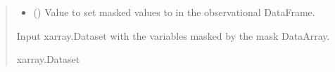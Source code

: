 \documentclass[letterpaper,10pt,english]{sphinxmanual}
\begin{document}
\begin{fulllineitems}
\begin{quote}
\begin{description}
\begin{itemize}
\item {}
\sphinxAtStartPar
{} () \textendash{} Value to set masked values to in the observational DataFrame.

\end{itemize}

\sphinxAtStartPar
{} \textendash{} Input xarray.Dataset with the variables masked by the mask DataArray.

\sphinxAtStartPar
xarray.Dataset

\end{description}\end{quote}

\end{fulllineitems}

\end{document}
